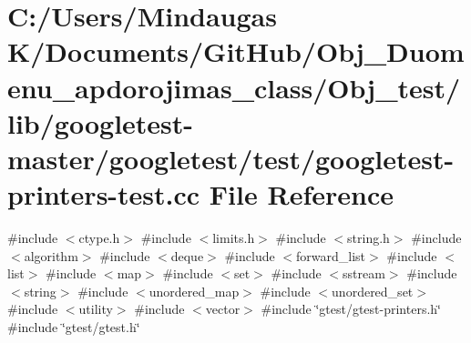 \hypertarget{_obj__test_2lib_2googletest-master_2googletest_2test_2googletest-printers-test_8cc}{}\section{C\+:/\+Users/\+Mindaugas K/\+Documents/\+Git\+Hub/\+Obj\+\_\+\+Duomenu\+\_\+apdorojimas\+\_\+class/\+Obj\+\_\+test/lib/googletest-\/master/googletest/test/googletest-\/printers-\/test.cc File Reference}
\label{_obj__test_2lib_2googletest-master_2googletest_2test_2googletest-printers-test_8cc}
{\ttfamily \#include $<$ctype.\+h$>$}\newline
{\ttfamily \#include $<$limits.\+h$>$}\newline
{\ttfamily \#include $<$string.\+h$>$}\newline
{\ttfamily \#include $<$algorithm$>$}\newline
{\ttfamily \#include $<$deque$>$}\newline
{\ttfamily \#include $<$forward\+\_\+list$>$}\newline
{\ttfamily \#include $<$list$>$}\newline
{\ttfamily \#include $<$map$>$}\newline
{\ttfamily \#include $<$set$>$}\newline
{\ttfamily \#include $<$sstream$>$}\newline
{\ttfamily \#include $<$string$>$}\newline
{\ttfamily \#include $<$unordered\+\_\+map$>$}\newline
{\ttfamily \#include $<$unordered\+\_\+set$>$}\newline
{\ttfamily \#include $<$utility$>$}\newline
{\ttfamily \#include $<$vector$>$}\newline
{\ttfamily \#include \char`\"{}gtest/gtest-\/printers.\+h\char`\"{}}\newline
{\ttfamily \#include \char`\"{}gtest/gtest.\+h\char`\"{}}\newline
